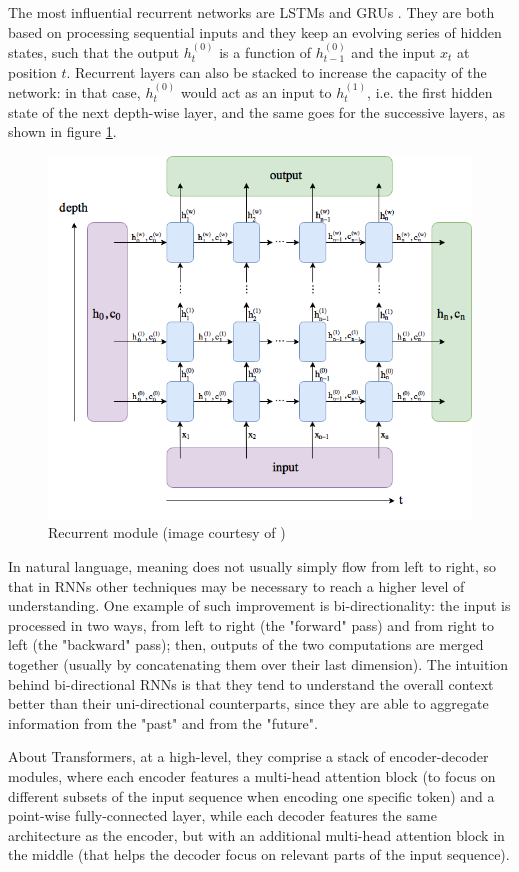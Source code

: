 \documentclass[a4paper,10pt]{report}
\begin{document}
The most influential recurrent networks are LSTMs \cite{lstm} and GRUs \cite{gru}. They are both based on processing sequential inputs and they keep an evolving series of hidden states, such that the output $h_t^{(0)}$ is a function of $h_{t-1}^{(0)}$ and the input $x_t$ at position $t$. Recurrent layers can also be stacked to increase the capacity of the network: in that case, $h_t^{(0)}$ would act as an input to $h_t^{(1)}$, i.e. the first hidden state of the next depth-wise layer, and the same goes for the successive layers, as shown in figure \ref{fig:recurrent}.

\begin{figure}[h]
    \center
    \includegraphics[width=0.65\linewidth]{recurrent}
    \caption{Recurrent module (image courtesy of \cite{recurrent-img})}
    \label{fig:recurrent}
\end{figure}

In natural language, meaning does not usually simply flow from left to right, so that in RNNs other techniques may be necessary to reach a higher level of understanding. One example of such improvement is bi-directionality: the input is processed in two ways, from left to right (the "forward" pass) and from right to left (the "backward" pass); then, outputs of the two computations are merged together (usually by concatenating them over their last dimension). The intuition behind bi-directional RNNs is that they tend to understand the overall context better than their uni-directional counterparts, since they are able to aggregate information from the "past" and from the "future".

About Transformers, at a high-level, they comprise a stack of encoder-decoder modules, where each encoder features a multi-head attention block (to focus on different subsets of the input sequence when encoding one specific token) and a point-wise fully-connected layer, while each decoder features the same architecture as the encoder, but with an additional multi-head attention block in the middle (that helps the decoder focus on relevant parts of the input sequence).
\end{document}

